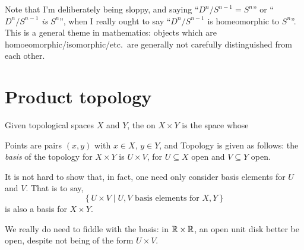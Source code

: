 \begin{abuse}
	Note that I'm deliberately being sloppy, and saying
	``$D^n / S^{n-1} = S^n$'' or ``$D^n / S^{n-1}$ \emph{is} $S^n$'',
	when I really ought to say ``$D^n / S^{n-1}$ is homeomorphic to $S^n$''.
	This is a general theme in mathematics:
	objects which are homoeomorphic/isomorphic/etc.\ are generally
	not carefully distinguished from each other.
\end{abuse}

\section{Product topology}

\begin{definition}
	Given topological spaces $X$ and $Y$,
	the  on $X \times Y$ is the space whose
	\begin{itemize}
		\ii Points are pairs $(x,y)$ with $x \in X$, $y \in Y$, and
		\ii Topology is given as follows: the \emph{basis} of
		the topology for $X \times Y$ is $U \times V$,
		for $U \subseteq X$ open and $V \subseteq Y$ open.
	\end{itemize}
\end{definition}

\begin{remark}
	It is not hard to show that, in fact,
	one need only consider basis elements for $U$ and $V$.
	That is to say,
	\[ \left\{ U \times V \mid
		U,V \text{ basis elements for } X,Y \right\} \]
	is also a basis for $X \times Y$.

	We really do need to fiddle with the basis:
	in $\mathbb R \times \mathbb R$, an open unit disk better be open,
	despite not being of the form $U \times V$.
\end{remark}

